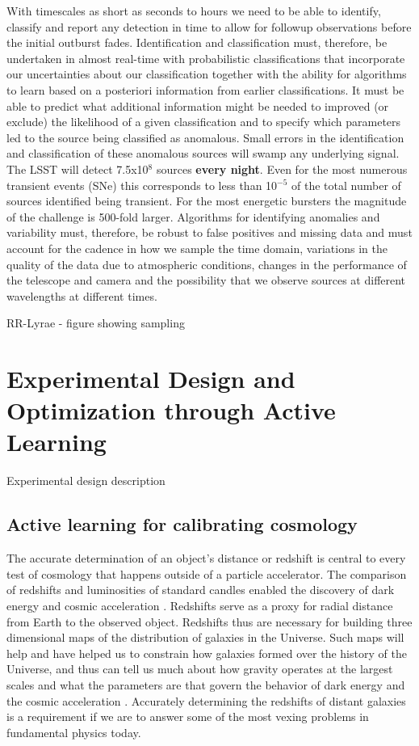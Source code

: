 \documentclass[useAMS,usenatbib,tightenlines,11pt,preprint]{aastex}
\begin{document}
With timescales as short as seconds to hours we need to be able to
identify, classify and report any detection in time to allow for
followup observations before the initial outburst
fades. Identification and classification must, therefore, be
undertaken in almost real-time with probabilistic classifications that
incorporate our uncertainties about our classification together with
the ability for algorithms to learn based on a posteriori information
from earlier classifications. It must be able to predict what
additional information might be needed to improved (or exclude) the
likelihood of a given classification and to specify which parameters
led to the source being classified as anomalous. Small errors in the
identification and classification of these anomalous sources will
swamp any underlying signal. The LSST will detect 7.5x10$^8$ sources
{\bf every night}. Even for the most numerous transient events (SNe)
this corresponds to less than 10$^{-5}$ of the total number of sources
identified being transient. For the most energetic bursters the
magnitude of the challenge is 500-fold larger.  Algorithms for
identifying anomalies and variability must, therefore, be robust to
false positives and missing data and must account for the cadence in
how we sample the time domain, variations in the quality of the data
due to atmospheric conditions, changes in the performance of the
telescope and camera and the possibility that we observe sources at
different wavelengths at different times.


RR-Lyrae - figure showing sampling






\section{Experimental Design and Optimization through Active
  Learning}
 
Experimental design description

\subsection{Active learning for calibrating cosmology}

The accurate determination of an object's distance or redshift is
central to every test of cosmology that happens outside of a particle
accelerator.  The comparison of redshifts and luminosities of standard
candles enabled the discovery of dark energy and cosmic acceleration
\cite{perlmutter1998}. Redshifts serve as a proxy for radial distance
from Earth to the observed object.  Redshifts thus are necessary for
building three dimensional maps of the distribution of galaxies in the
Universe.  Such maps will help and have helped us to constrain how
galaxies formed over the history of the Universe, and thus can tell us
much about how gravity operates at the largest scales and what the
parameters are that govern the behavior of dark energy and the cosmic
acceleration \cite{muvarpi2,roland,sudeep}.  Accurately determining the redshifts of
distant galaxies is a requirement if we are to answer some of the most
vexing problems in fundamental physics today.
\end{document}
